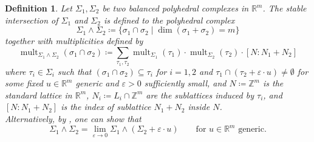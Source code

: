 \documentclass[11pt,reqno,a4paper]{amsart}
\theoremstyle{theoremstyle}
\theoremstyle{examplestyle}
\newtheorem{definition}[theorem]{Definition}
\theoremstyle{algorithmstyle}
\newcommand{\RR}{\mathbb{R}}
\newcommand{\ZZ}{\mathbb{Z}}
\DeclareMathOperator{\mult}{mult}
\begin{document}
\begin{definition}
  \label{def:stableIntersectionMS}
  Let $\Sigma_1, \Sigma_2$ be two balanced polyhedral complexes in $\RR^m$. The \emph{stable intersection} of $\Sigma_1$ and $\Sigma_2$ is defined to the polyhedral complex
  \begin{equation*}
    \Sigma_1\wedge\Sigma_2 \coloneqq \Big\{ \sigma_1\cap\sigma_2 \mid \dim(\sigma_1+\sigma_2)=m\Big\}
  \end{equation*}
  together with multiplicities defined by
  \begin{equation*}
    \mult_{\Sigma_1\wedge\Sigma_2}(\sigma_1\cap\sigma_2)\coloneqq \sum_{\tau_1, \tau_2} \mult_{\Sigma_1}(\tau_1)\cdot \mult_{\Sigma_2}(\tau_2) \cdot [N:N_1+N_2]
  \end{equation*}
  where $\tau_i\in\Sigma_i$ such that $(\sigma_1\cap\sigma_2)\subseteq\tau_i$ for $i={1,2}$ and $\tau_1\cap(\tau_2+\varepsilon\cdot u)\neq \emptyset$ for some fixed $u\in\RR^m$ generic and $\varepsilon>0$ sufficiently small, and $N\coloneqq \ZZ^m$ is the standard lattice in $\RR^m$, $N_i\coloneqq L_i\cap\ZZ^m$ are the sublattices induced by $\tau_i$, and $[N:N_1+N_2]$ is the index of sublattice $N_1+N_2$ inside $N$.
  \\Alternatively, by \cite[Proposition 3.6.12]{MaclaganSturmfels2015}, one can show that
  \begin{equation*}
    \Sigma_1\wedge\Sigma_2=\lim_{\varepsilon\rightarrow 0}\Sigma_1\wedge (\Sigma_2+\varepsilon\cdot u) \qquad\text{for } u\in\RR^m\text{ generic}.
  \end{equation*}
\end{definition}


\end{document}
